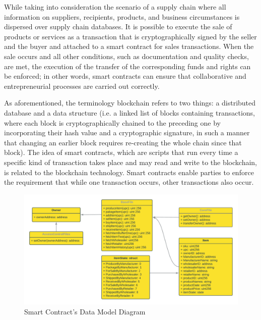 While taking into consideration the scenario of a supply chain where all information on suppliers, recipients, products, and business circumstances is dispersed over supply chain databases.
It is possible to execute the sale of products or services as a transaction that is cryptographically signed by the seller and the buyer and attached to a smart contract for sales transactions. When the sale occurs and all other conditions, such as documentation and quality checks, are met, the execution of the transfer of the corresponding funds and rights can be enforced; in other words, smart contracts can ensure that collaborative and entrepreneurial processes are carried out correctly.

\vspace{.5cm}

As aforementioned, the terminology blockchain refers to two things: a distributed database and a data structure (i.e. a linked list of blocks containing transactions, where each block is cryptographically chained to the preceding one by incorporating their hash value and a cryptographic signature, in such a manner that changing an earlier block requires re-creating the whole chain since that block). The idea of smart contracts, which are scripts that run every time a specific kind of transaction takes place and may read and write to the blockchain, is related to the blockchain technology. Smart contracts enable parties to enforce the requirement that while one transaction occurs, other transactions also occur.

\vspace{.5cm}

    \begin{figure}[h]
    \centering
      \includegraphics[width=15cm]{includes/figures/Data Model diagram.png} 
      \caption{Smart Contract's Data Model Diagram}
      \label{Data Model diagram}
    \end{figure}
    
